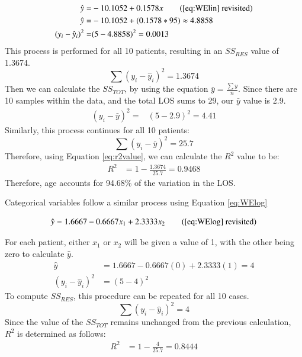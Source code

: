 \documentclass[../thesis.tex]{subfiles}
\begin{document}
\begin{align}
    \hat y =& -10.1052 + 0.1578x \tag{\ref{eq:WElin} revisited}\\
    \hat y =& -10.1052 + (0.1578* 95) \approx 4.8858 \\
    (y_{i} -\hat y_{i})^{2} =& (5-4.8858)^{2} = 0.0013
\end{align}
This process is performed for all 10 patients, resulting in an $SS_{RES}$ value of 1.3674.
\begin{equation}
    \sum (y_{i} - \hat y_{i})^2 = 1.3674
\end{equation}
Then we can calculate the $SS_{TOT}$, by using the equation $ \bar y = \frac{\sum y}{n}$. Since there are 10 samples within the data, and the total LOS sums to 29, our $\bar y$ value is 2.9. 
\begin{align}
    (y_{i} -\bar y)^{2} =& (5-2.9)^2 = 4.41
\end{align}
Similarly, this process continues for all 10 patients:
\begin{equation}
    \sum(y_{i} -\bar y)^{2} = 25.7
\end{equation}
Therefore, using Equation \eqref{eq:r2value}, we can calculate the $R^2$ value to be:
\begin{align}
    R^{2} &= 1 - \frac{1.3674}{25.7} = 0.9468
\end{align}
Therefore, age accounts for 94.68\% of the variation in the LOS.

Categorical variables follow a similar process using Equation \eqref{eq:WElog}

\begin{equation}
    \hat y=1.6667 -0.6667x_{1} +2.3333x_{2}\tag{\ref{eq:WElog} revisited}
\end{equation}

For each patient, either $x_{1}$ or $x_{2}$ will be given a value of 1, with the other being zero to calculate $\hat y$.
\begin{align}
    \hat y &= 1.6667 -0.6667(0) +2.3333(1) = 4\\
    (y_{i} - \hat y_{i})^2 &= (5-4)^2 
\end{align}
To compute $SS_{RES}$, this procedure can be repeated for all 10 cases.
\begin{equation}
    \sum(y_{i} - \hat y_{i})^2 = 4
\end{equation}
Since the value of the $SS_{TOT}$ remains unchanged from the previous calculation, $R^{2}$ is determined as follows:
\begin{align}
    R^{2} &= 1 - \frac{4}{25.7}  = 0.8444
\end{align}
\end{document}
